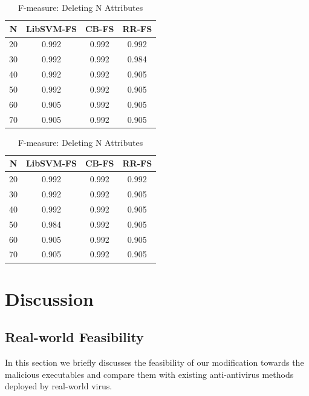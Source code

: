 \documentclass[11pt]{article}
\begin{document}
\begin{table}[!htb]

\centering
\begin{minipage}{0.47\columnwidth}
\begin{tabular}{c  c  c c} \hline
\centering

N & LibSVM-FS & CB-FS & RR-FS \\\hline
20 & 0.992 & 0.992 & 0.992 \\
30 & 0.992 & 0.992 & 0.984 \\
40 & 0.992 & 0.992 & 0.905 \\
50 & 0.992 & 0.992 & 0.905 \\
60 & 0.905 & 0.992 & 0.905 \\
70 & 0.905 & 0.992 & 0.905 \\\hline
\end{tabular}
\caption{F-measure: Adding N Attributes} %
\label{tbl:add}
\end{minipage}
\hfill
\begin{minipage}{0.47\columnwidth}
\begin{tabular}{c  c  c c} \hline
\centering

N & LibSVM-FS & CB-FS & RR-FS \\\hline
20 & 0.992 & 0.992 & 0.992 \\
30 & 0.992 & 0.992 & 0.905 \\
40 & 0.992 & 0.992 & 0.905 \\
50 & 0.984 & 0.992 & 0.905 \\
60 & 0.905 & 0.992 & 0.905 \\
70 & 0.905 & 0.992 & 0.905 \\\hline
\end{tabular}
\caption{F-measure: Deleting N Attributes} %
\label{tbl:delete}
\end{minipage}
\end{table}

\section{Discussion}

\subsection{Real-world Feasibility}
In this section we briefly discusses the feasibility of our modification towards the malicious executables and compare them with existing anti-antivirus methods deployed by real-world virus.
\end{document}
